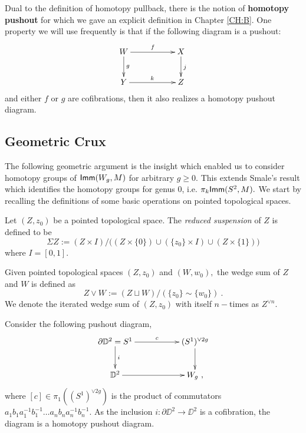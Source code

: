 \begin{remark}
Dual to the definition of homotopy pullback, there is the notion of \textbf{homotopy pushout} for which we gave an explicit definition in Chapter \ref{CH:B}. One property we will use frequently is that if the following diagram is a pushout:
\[
\xymatrix{
W \ar[rr]^-{f} \ar[d]^-{g}
&&
X \ar[d]^{j}
\\
Y \ar[rr]^{k}
&&
Z
}
\]
and either $f$ or $g$ are cofibrations, then it also realizes a homotopy pushout diagram.
\end{remark}

\subsection{Geometric Crux}
The following geometric argument is the insight which enabled us to consider homotopy groups of ${\sf Imm}(W_{g}, M)$ for arbitrary $g \geq 0.$ This extends Smale's result \cite{Sm3} which identifies the homotopy groups for genus 0, i.e. $\pi_{k}{\sf Imm}(S^{2}, M).$ We start by recalling the definitions of some basic operations on pointed topological spaces.

\begin{definition}
Let $(Z, z_{0})$ be a pointed topological space. The \textit{reduced suspension} of $Z$ is defined to be 
\[
\Sigma Z := (Z \times I)/ \Big((Z \times \{0\}) \cup (\{z_{0}\} \times I) \cup (Z \times \{1\}) \Big)
\] 
where $I = [0, 1].$
\end{definition}

\begin{definition}
Given pointed topological spaces $(Z, z_{0})$ and $(W, w_{0}),$ the wedge sum of $Z$ and $W$ is defined as 
\[
Z \vee W := (Z \sqcup W)/(\{z_{0}\} \sim \{w_{0}\})~.
\]
We denote the iterated wedge sum of $(Z, z_{0})$ with itself $n-$times as $Z^{\vee n}.$
\end{definition}

\begin{observation} \label{ooooo}
Consider the following pushout diagram,
\begin{equation}\label{classicpushout}
\xymatrix{
\partial \DD^{2} = S^{1} \ar[rr]^-{c} \ar[d]^-{i}
&&
(S^{1})^{\vee 2g} \ar[d]^-{}
\\
\DD^{2} \ar[rr]^-{} 
&&
W_{g}~,
}
\end{equation}
where $[c] \in \pi_{1}((S^{1})^{\vee 2g})$ is the product of commutators $a_{1}b_{1}a_{1}^{-1}b_{1}^{-1} \hdots a_{n}b_{n}a_{n}^{-1}b_{n}^{-1}.$ As the inclusion $i: \partial \DD^{2} \rightarrow \DD^{2}$ is a cofibration, the diagram is a homotopy pushout diagram.
\end{observation}




